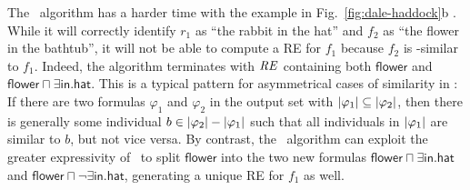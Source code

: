 The \el\ algorithm has a harder time with the example in
Fig.~\ref{fig:dale-haddock}b \cite{Stone1998a}.  While it will
correctly identify $r_1$ as ``the rabbit in the hat'' and $f_2$ as
``the flower in the bathtub'', it will not be able to compute a RE for
$f_1$ because $f_2$ is \el-similar to $f_1$.  Indeed, the algorithm
terminates with $\mathit{RE}$ containing both $\mathsf{flower}$ and
$\mathsf{flower} \sqcap \exists \mathsf{in}.\mathsf{hat}$.  This is a
typical pattern for asymmetrical cases of similarity in \el: If there
are two formulas $\varphi_1$ and $\varphi_2$ in the output set with
$|\varphi_1| \subseteq |\varphi_2|$, then there is
generally some individual $b \in |\varphi_2| -
|\varphi_1|$ such that all individuals in $|\varphi_1|$
are similar to $b$, but not vice versa.  By contrast, the \alc\
algorithm can exploit the greater expressivity of \alc\ to split
$\mathsf{flower}$ into the two new formulas $\mathsf{flower} \sqcap
\exists \mathsf{in}.\mathsf{hat}$ and $\mathsf{flower} \sqcap \neg
\exists \mathsf{in}.\mathsf{hat}$, generating a unique RE for $f_1$ as
well.






